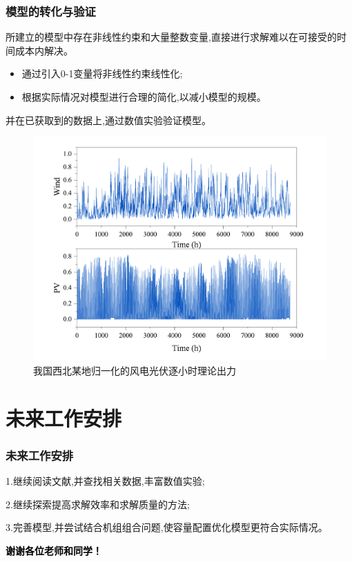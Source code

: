 \documentclass{beamer}
\begin{document}
\begin{frame}
	\frametitle{模型的转化与验证}
	\qquad 所建立的模型中存在非线性约束和大量整数变量,直接进行求解难以在可接受的时间成本内解决。
	\begin{itemize}
		\item 通过引入0-1变量将非线性约束线性化;
		\item 根据实际情况对模型进行合理的简化,以减小模型的规模。
	\end{itemize}
	\qquad 并在已获取到的数据上,通过数值实验验证模型。
	\begin{figure}
		\centering
		\setlength{\abovecaptionskip}{0.cm}
		\includegraphics[scale=0.2]{./pic/windPV.pdf}
		\caption{我国西北某地归一化的风电光伏逐小时理论出力}
		\label{fig.2}
	\end{figure}
\end{frame}

\section{未来工作安排}
\begin{frame}
	\frametitle{未来工作安排} 
	1.继续阅读文献,并查找相关数据,丰富数值实验;

	2.继续探索提高求解效率和求解质量的方法;

	3.完善模型,并尝试结合机组组合问题,使容量配置优化模型更符合实际情况。
\end{frame}

\begin{frame}
\vspace{1em}
\centering
\textcolor{black}{\LARGE\bf 谢谢各位老师和同学！}

\end{frame}
\end{document}
